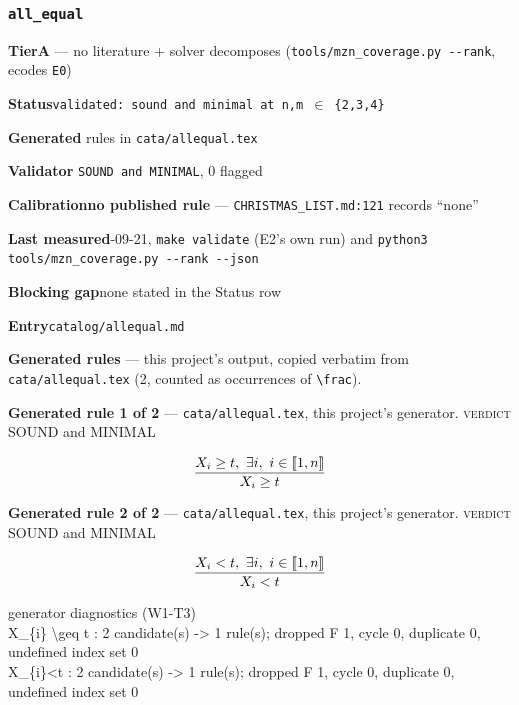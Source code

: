\documentclass[10pt,a4paper]{article}
\newcommand{\entryfield}[2]{{\raggedright\textbf{#1}\quad #2\par}}
\newcommand{\diag}[1]{{\small\itshape\raggedright #1\par}}
\newcommand{\rulebox}[1]{%
  \[\resizebox{\ifdim\width>\linewidth\linewidth\else\width\fi}{!}%
    {$\displaystyle #1$}\]}
\begin{document}
\subsubsection*{\texttt{all\_\allowbreak{}equal}}
\label{entry:allequal}
\entryfield{Tier}{\textbf{A} --- no literature + solver decomposes (\texttt{tools/\allowbreak{}mzn\_\allowbreak{}coverage.\allowbreak{}py -\allowbreak{}-\allowbreak{}rank}, ecodes \texttt{E0})}
\entryfield{Status}{\texttt{validated: sound and minimal at n,m $\in$ \{2,3,4\}}}
\entryfield{Generated}{2 rules in \texttt{cata/allequal.tex}}
\entryfield{Validator}{2 \texttt{SOUND and MINIMAL}, 0 flagged}
\entryfield{Calibration}{\textbf{no published rule} --- \texttt{CHRISTMAS\_LIST.md:121} records ``none''}
\entryfield{Last measured}{2026-09-21, \texttt{make validate} (E2's own run) and \texttt{python3 tools/\allowbreak{}mzn\_\allowbreak{}coverage.\allowbreak{}py -\allowbreak{}-\allowbreak{}rank -\allowbreak{}-\allowbreak{}json}}
\entryfield{Blocking gap}{none stated in the Status row}
\entryfield{Entry}{\texttt{catalog/allequal.md}}

\textbf{Generated rules} --- this project's output, copied verbatim from \texttt{cata/allequal.tex} (2, counted as occurrences of \texttt{\textbackslash{}frac}).\par

{\small\textbf{Generated rule 1 of 2} --- \texttt{cata/allequal.tex}, this project's generator. \textsc{verdict} SOUND and MINIMAL\par}
\rulebox{\frac{X_{i} \geq t,~\exists i,~i \in \llbracket1,n\rrbracket}{X_{i} \geq t}}

{\small\textbf{Generated rule 2 of 2} --- \texttt{cata/allequal.tex}, this project's generator. \textsc{verdict} SOUND and MINIMAL\par}
\rulebox{\frac{X_{i}<t,~\exists i,~i \in \llbracket1,n\rrbracket}{X_{i}<t}}

\diag{generator diagnostics (W1-T3)\\{} X\_\{i\} \textbackslash{}geq t : 2 candidate(s) -> 1 rule(s); dropped F 1, cycle 0, duplicate 0, undefined index set 0\\{} X\_\{i\}<t : 2 candidate(s) -> 1 rule(s); dropped F 1, cycle 0, duplicate 0, undefined index set 0}
\end{document}
